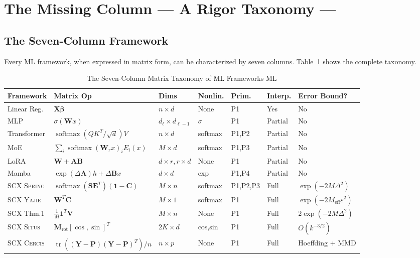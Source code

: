 \documentclass[12pt,a4paper]{article}
\theoremstyle{definition}
\newcommand{\Situs}{\textsc{Situs}}
\newcommand{\Yajie}{\textsc{Yajie}}
\newcommand{\Spring}{\textsc{Spring}}
\newcommand{\Cercis}{\textsc{Cercis}}
\newcommand{\SCX}{\textsc{SCX}}
\DeclareMathOperator{\tr}{tr}
\DeclareMathOperator{\softmax}{softmax}
\newcommand{\ones}{\mathbf{1}}
\newcommand{\mat}[1]{\mathbf{#1}}
\begin{document}
\section{The Missing Column — A Rigor Taxonomy ---}
\label{sec:missing_column}

\subsection{The Seven-Column Framework }

Every ML framework, when expressed in matrix form, can be characterized by seven 
columns. Table~\ref{tab:seven_columns} shows the complete taxonomy.

\begin{table}[htbp]
\centering
\caption{The Seven-Column Matrix Taxonomy of ML Frameworks ML}
\label{tab:seven_columns}
\small
\begin{tabular}{@{}p{1.8cm}p{2.8cm}p{1.6cm}p{1.3cm}p{1.3cm}p{1.3cm}p{3.2cm}@{}}
\toprule
\textbf{Framework} & \textbf{Matrix Op} & \textbf{Dims} & \textbf{Nonlin.} & \textbf{Prim.} & \textbf{Interp.} & \textbf{Error Bound?} \\
\midrule
Linear Reg.    & $\mat{X}\boldsymbol{\beta}$ & $n \times d$ & None & P1 & Yes & No \\
MLP            & $\sigma(\mat{W}x)$ & $d_\ell \times d_{\ell-1}$ & $\sigma$ & P1 & Partial & No \\
Transformer    & $\softmax(QK^T/\sqrt{d})V$ & $n \times d$ & softmax & P1,P2 & Partial & No \\
MoE            & $\sum_i \softmax(\mat{W}_r x)_i E_i(x)$ & $M \times d$ & softmax & P1,P3 & Partial & No \\
LoRA           & $\mat{W} + \mat{A}\mat{B}$ & $d \times r, r \times d$ & None & P1 & Partial & No \\
Mamba          & $\exp(\Delta\mat{A})h + \Delta\mat{B}x$ & $d \times d$ & exp & P1,P4 & Partial & No \\
\midrule
\rowcolor{green!6}
\SCX{} \Spring{}  & $\softmax(\mat{S}\mat{E}^T)(\ones-\mat{C})$ & $M \times n$ & softmax & P1,P2,P3 & Full & $\exp(-2M\Delta^2)$ \\
\rowcolor{green!6}
\SCX{} \Yajie{}   & $\mat{W}^T \mat{C}$ & $M \times 1$ & softmax & P1 & Full & $\exp(-2M_{\text{eff}}\varepsilon^2)$ \\
\rowcolor{green!6}
\SCX{} Thm.1      & $\frac{1}{M}\ones^T \mat{V}$ & $M \times n$ & None & P1 & Full & $2\exp(-2M\Delta^2)$ \\
\rowcolor{green!6}
\SCX{} \Situs{}   & $\mat{M}_{\text{rot}}[\cos,\sin]^T$ & $2K \times d$ & cos,sin & P1 & Full & $O(k^{-3/2})$ \\
\rowcolor{green!6}
\SCX{} \Cercis{}  & $\tr((\mat{Y}-\mat{P})(\mat{Y}-\mat{P})^T)/n$ & $n \times p$ & None & P1 & Full & Hoeffding + MMD \\
\bottomrule
\end{tabular}
\end{table}
\end{document}
